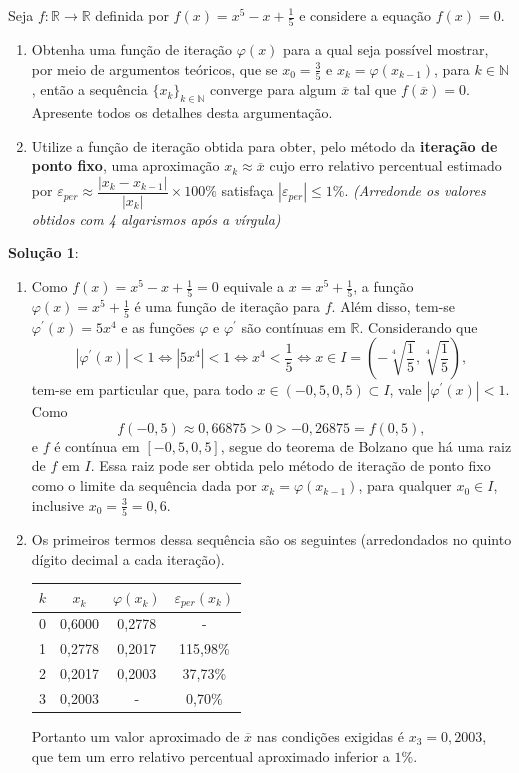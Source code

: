 \documentclass[12pt,a4paper]{article}
\begin{document}
\begin{ExerciseList}
\Exercise[title={2,0}]
Seja $f:\mathbb{R} \to \mathbb{R}$ definida por $f(x) = x^5-x + \frac{1}{5}$ e considere a equação $f(x)=0$.
\begin{enumerate}
\item Obtenha uma função de iteração $\varphi(x)$ para a qual seja possível mostrar, por meio de argumentos teóricos, que se $x_0 = \frac{3}{5}$ e $x_k = \varphi(x_{k-1})$, para $k \in \mathbb{N}$, então a sequência $\{x_k\}_{k \in \mathbb{N}}$ converge para algum $\overline{x}$ tal que $f(\overline{x}) = 0$. Apresente todos os detalhes desta argumentação.
\item Utilize a função de iteração obtida para obter, pelo método da \textbf{iteração de ponto fixo}, uma aproximação $x_k \approx \overline{x}$ cujo erro relativo percentual estimado por $\varepsilon_{per} \approx \dfrac{|x_k - x_{k-1}|}{|x_k|} \times 100\%$ satisfaça $|\varepsilon_{per}| \leq 1\%$.
{\color{blue} \textit{(Arredonde os valores obtidos com 4 algarismos após a vírgula)}}
\end{enumerate}
\Answer \textbf{Solução 1}:
\begin{enumerate}
\item Como $f(x) = x^5 - x + \frac{1}{5} = 0$ equivale a $x = x^5 + \frac{1}{5}$, a função $\varphi(x) = x^5 + \frac{1}{5}$ é uma função de iteração para $f$. Além disso, tem-se $\varphi^\prime(x) = 5x^4$ e as funções $\varphi$ e $\varphi^\prime$ são contínuas em $\mathbb{R}$. Considerando que
\[
|\varphi^\prime(x)| < 1
\Leftrightarrow
\left|5x^4\right| < 1
\Leftrightarrow
x^4 < \frac{1}{5}
\Leftrightarrow
x \in I = \left(-\sqrt[4]{\frac{1}{5}}, \sqrt[4]{\frac{1}{5}}\right),
\]
tem-se em particular que, para todo $x \in (-0,5, 0,5) \subset I$, vale $|\varphi^\prime(x)| < 1$. Como
\[
f(-0,5) \approx 0,66875 > 0 > -0,26875 = f(0,5),
\]
e $f$ é contínua em $[-0,5, 0,5]$, segue do teorema de Bolzano que há uma raiz de $f$ em $I$. Essa raiz pode ser obtida pelo método de iteração de ponto fixo como o limite da sequência dada por $x_k = \varphi(x_{k-1})$, para qualquer $x_0 \in I$, inclusive $x_0 = \frac{3}{5} = 0,6$.

\item Os primeiros termos dessa sequência são os seguintes (arredondados no quinto dígito decimal a cada iteração).

\begin{center}
\begin{tabular}{cccc}
\hline
$k$ & $x_k$ & $\varphi(x_k)$ & $\varepsilon_{per}(x_k)$\\
\hline
0 & 0,6000 & 0,2778 & - \\
1 & 0,2778 & 0,2017 & 115,98\% \\
2 & 0,2017 & 0,2003 &  37,73\% \\
3 & 0,2003 & - &  0,70\% \\
\hline
\end{tabular}
\end{center}
Portanto um valor aproximado de $\overline{x}$ nas condições exigidas é $x_3 = 0,2003$, que tem um erro relativo percentual aproximado inferior a $1\%$.
\end{enumerate}


\end{ExerciseList}
\end{document}
